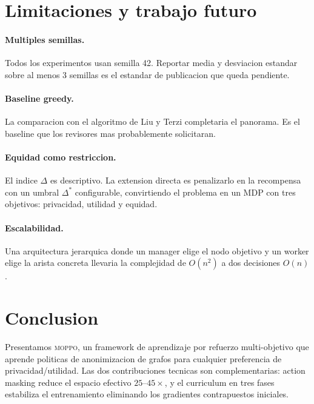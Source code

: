 \documentclass[10pt,twocolumn,letterpaper]{article}
\newcommand{\moppo}{\textsc{moppo}}
\newcommand{\Ddelta}{\Delta}
\begin{document}
\section{Limitaciones y trabajo futuro}

\paragraph{Multiples semillas.}
Todos los experimentos usan semilla 42. Reportar media y desviacion estandar sobre al
menos 3 semillas es el estandar de publicacion que queda pendiente.

\paragraph{Baseline greedy.}
La comparacion con el algoritmo de Liu y Terzi \citep{liu2008towards} completaria el
panorama. Es el baseline que los revisores mas probablemente solicitaran.

\paragraph{Equidad como restriccion.}
El indice $\Ddelta$ es descriptivo. La extension directa es penalizarlo en la
recompensa con un umbral $\Ddelta^*$ configurable, convirtiendo el problema en un MDP
con tres objetivos: privacidad, utilidad y equidad.

\paragraph{Escalabilidad.}
Una arquitectura jerarquica donde un manager elige el nodo objetivo y un worker elige
la arista concreta llevaria la complejidad de $O(n^2)$ a dos decisiones $O(n)$.

\section{Conclusion}

Presentamos \moppo{}, un framework de aprendizaje por refuerzo multi-objetivo que
aprende politicas de anonimizacion de grafos para cualquier preferencia de
privacidad/utilidad. Las dos contribuciones tecnicas son complementarias: action
masking reduce el espacio efectivo $25$--$45\times$, y el curriculum en tres fases
estabiliza el entrenamiento eliminando los gradientes contrapuestos iniciales.
\end{document}

